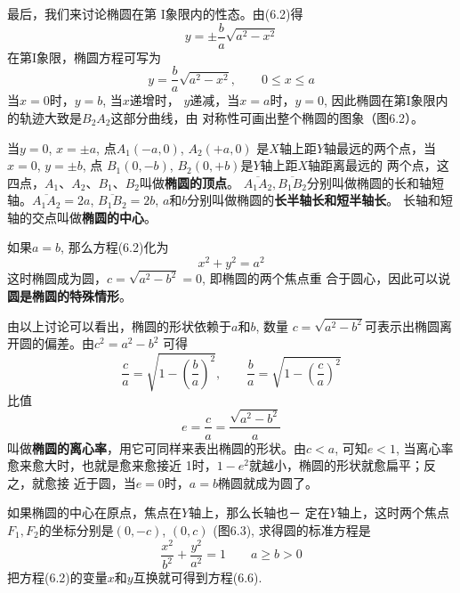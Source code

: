 最后，我们来讨论椭圆在第
I象限内的性态。由(6.2)得
\[y=\pm\frac{b}{a}\sqrt{a^2-x^2}\]
在第I象限，椭圆方程可写为
\[y=\frac{b}{a}\sqrt{a^2-x^2},\qquad 0\le x\le a\]
当$x=0$时，$y=b$, 当$x$递增时，
$y$递减，当$x=a$时，$y=0$, 
因此椭圆在第I象限内的轨迹大致是$B_2A_2$这部分曲线，由
对称性可画出整个椭圆的图象（图6.2）。

\begin{figure}[htp]
    \centering
    \caption{}
\end{figure}

当$y=0$, $x=\pm a$, 点$A_1(-a,0)$, $A_2(+a,0)$
是$X$轴上距$Y$轴最远的两个点，当$x=0$, $y=\pm b$, 点
$B_1(0,-b)$, $B_2(0,+b)$是$Y$轴上距$X$轴距离最远的
两个点，这四点，$A_1$、$A_2$、$B_1$、$B_2$叫做\textbf{椭圆的顶点}。
$\overline{A_1A_2},\overline{B_1B_2}$分别叫做椭圆的长和轴短轴。$\overline{A_1A_2}=2a$, 
$\overline{B_1B_2}=2b$, $a$和$b$分别叫做椭圆的\textbf{长半轴长和短半轴长}。
长轴和短轴的交点叫做\textbf{椭圆的中心}。

如果$a=b$, 那么方程(6.2)化为
\[x^2+y^2=a^2\]
这时椭圆成为圆，$c=\sqrt{a^2-b^2}=0$, 即椭圆的两个焦点重
合于圆心，因此可以说\textbf{圆是椭圆的特殊情形}。

由以上讨论可以看出，椭圆的形状依赖于$a$和$b$, 数量
$c=\sqrt{a^2-b^2}$可表示出椭圆离开圆的偏差。由$c^2=a^2-b^2$
可得
\[\frac{c}{a}=\sqrt{1-\left(\frac{b}{a}\right)^2},\qquad \frac{b}{a}=\sqrt{1-\left(\frac{c}{a}\right)^2}\]
比值
\[e=\frac{c}{a}=\frac{\sqrt{a^2-b^2}}{a}\]
叫做\textbf{椭圆的离心率}，用它可同样来表出椭圆的形状。由$c<
a$, 可知$e<1$, 当离心率愈来愈大时，也就是愈来愈接近
1时，$1-e^2$就越小，椭圆的形状就愈扁平；反之，就愈接
近于圆，当$e=0$时，$a=b$椭圆就成为圆了。

如果椭圆的中心在原点，焦点在$Y$轴上，那么长轴也－
定在$Y$轴上，这时两个焦点$F_1,F_2$的坐标分别是$(0,-c)$,
$(0,c)$ (图6.3), 求得圆的标准方程是
\begin{equation}
    \boxed{\frac{x^2}{b^2}+\frac{y^2}{a^2}=1}\qquad a\ge b>0
\end{equation}
把方程(6.2)的变量$x$和$y$互换就可得到方程(6.6).

